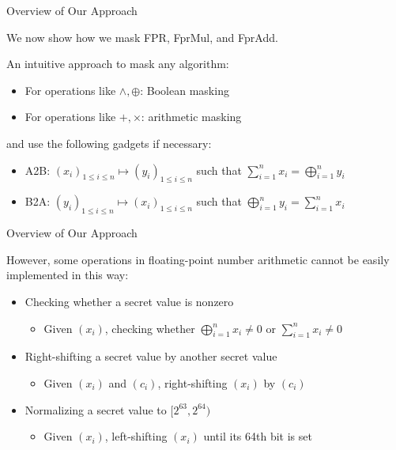 \begin{frame}{Overview of Our Approach}

We now show how we mask {\sf FPR}, {\sf FprMul}, and {\sf FprAdd}.
\pause

An intuitive approach to mask any algorithm:
\pause

\begin{itemize}
\item For operations like $\wedge, \oplus$: Boolean masking
\pause
\item For operations like $+, \times$: arithmetic masking
\end{itemize}
\pause
and use the following gadgets if necessary:
\pause
\begin{itemize}
	\item {\sf A2B}: $(x_i)_{1\leq i \leq n} \mapsto (y_i)_{1\leq i \leq n}$ such that $\sum_{i=1}^n x_i = \bigoplus_{i=1}^n y_i$
	\pause
	\item {\sf B2A}: $(y_i)_{1\leq i \leq n} \mapsto (x_i)_{1\leq i \leq n}$ such that $\bigoplus_{i=1}^n y_i = \sum_{i=1}^n x_i$
\end{itemize}

\end{frame}


\begin{frame}{Overview of Our Approach}

However, some operations in floating-point number arithmetic cannot be easily implemented in this way:
\pause
\begin{itemize}
	\item Checking whether a secret value is nonzero
	\begin{itemize}
		\item Given $(x_i)$, checking whether $\bigoplus_{i=1}^n x_i \neq 0$ or $\sum_{i=1}^n x_i \neq 0$
	\end{itemize}
	\pause
	\item Right-shifting a secret value by another secret value
	\begin{itemize}
		\item Given $(x_i)$ and $(c_i)$, right-shifting $(x_i)$ by $(c_i)$
	\end{itemize}
	\pause
	\item Normalizing a secret value to $[2^{63},2^{64})$
	\begin{itemize}
		\item Given $(x_i)$, left-shifting $(x_i)$ until its 64th bit is set
	\end{itemize}
\end{itemize}

\end{frame}


